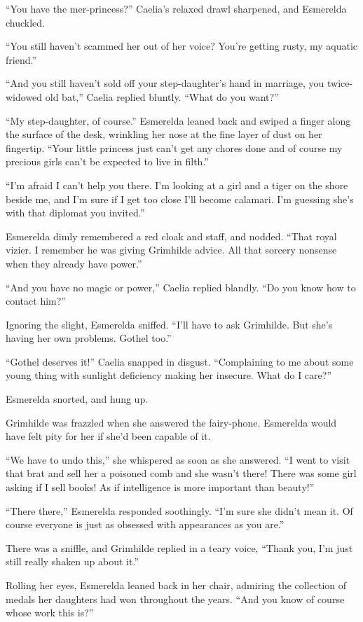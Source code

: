 “You have the mer-princess?” Caelia’s relaxed drawl sharpened, and Esmerelda chuckled.

“You still haven’t scammed her out of her voice? You’re getting rusty, my aquatic friend.”

“And you still haven’t sold off your step-daughter’s hand in marriage, you twice-widowed old bat,” Caelia replied bluntly. “What do you want?”

“My step-daughter, of course.” Esmerelda leaned back and swiped a finger along the surface of the desk, wrinkling her nose at the fine layer of dust on her fingertip. “Your little princess just can’t get any chores done and of course my precious girls can’t be expected to live in filth.”

“I’m afraid I can’t help you there. I’m looking at a girl and a tiger on the shore beside me, and I’m sure if I get too close I’ll become calamari. I’m guessing she’s with that diplomat you invited.”

Esmerelda dimly remembered a red cloak and staff, and nodded. “That royal vizier. I remember he was giving Grimhilde advice. All that sorcery nonsense when they already have power.”

“And you have no magic or power,” Caelia replied blandly. “Do you know how to contact him?”

Ignoring the slight, Esmerelda sniffed. “I’ll have to ask Grimhilde. But she’s having her own problems. Gothel too.”

“Gothel deserves it!” Caelia snapped in disgust. “Complaining to me about some young thing with sunlight deficiency making her insecure. What do I care?”

Esmerelda snorted, and hung up.

Grimhilde was frazzled when she answered the fairy-phone. Esmerelda would have felt pity for her if she’d been capable of it.

“We have to undo this,” she whispered as soon as she answered. “I went to visit that brat and sell her a poisoned comb and she wasn’t there! There was some girl asking if I sell books! As if intelligence is more important than beauty!”

“There there,” Esmerelda responded soothingly. “I’m sure she didn’t mean it. Of course everyone is just as obsessed with appearances as you are.”

There was a sniffle, and Grimhilde replied in a teary voice, “Thank you, I’m just still really shaken up about it.”

Rolling her eyes, Esmerelda leaned back in her chair, admiring the collection of medals her daughters had won throughout the years. “And you know of course whose work this is?”

